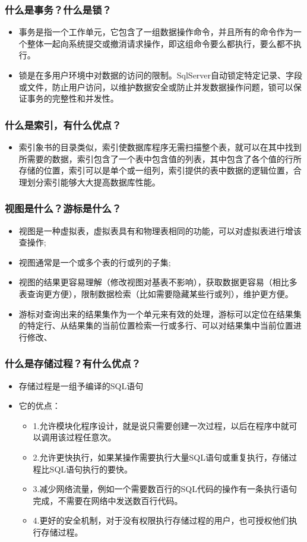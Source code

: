 \documentclass[9pt, b5paper]{article}
\begin{document}
\subsubsection{什么是事务？什么是锁？}
\label{sec-1-2-95}
\begin{itemize}
\item 事务是指一个工作单元，它包含了一组数据操作命令，并且所有的命令作为一个整体一起向系统提交或撤消请求操作，即这组命令要么都执行，要么都不执行。
\item 锁是在多用户环境中对数据的访问的限制。SqlServer自动锁定特定记录、字段或文件，防止用户访问，以维护数据安全或防止并发数据操作问题，锁可以保证事务的完整性和并发性。
\end{itemize}
\subsubsection{什么是索引，有什么优点？}
\label{sec-1-2-96}
\begin{itemize}
\item 索引象书的目录类似，索引使数据库程序无需扫描整个表，就可以在其中找到所需要的数据，索引包含了一个表中包含值的列表，其中包含了各个值的行所存储的位置，索引可以是单个或一组列，索引提供的表中数据的逻辑位置，合理划分索引能够大大提高数据库性能。
\end{itemize}
\subsubsection{视图是什么？游标是什么？}
\label{sec-1-2-97}
\begin{itemize}
\item 视图是一种虚拟表，虚拟表具有和物理表相同的功能，可以对虚拟表进行增该查操作;
\item 视图通常是一个或多个表的行或列的子集;
\item 视图的结果更容易理解（修改视图对基表不影响），获取数据更容易（相比多表查询更方便），限制数据检索（比如需要隐藏某些行或列），维护更方便。
\item 游标对查询出来的结果集作为一个单元来有效的处理，游标可以定位在结果集的特定行、从结果集的当前位置检索一行或多行、可以对结果集中当前位置进行修改、
\end{itemize}
\subsubsection{什么是存储过程？有什么优点？}
\label{sec-1-2-98}
\begin{itemize}
\item 存储过程是一组予编译的SQL语句
\item 它的优点：
\begin{itemize}
\item 1.允许模块化程序设计，就是说只需要创建一次过程，以后在程序中就可以调用该过程任意次。
\item 2.允许更快执行，如果某操作需要执行大量SQL语句或重复执行，存储过程比SQL语句执行的要快。
\item 3.减少网络流量，例如一个需要数百行的SQL代码的操作有一条执行语句完成，不需要在网络中发送数百行代码。
\item 4.更好的安全机制，对于没有权限执行存储过程的用户，也可授权他们执行存储过程。
\end{itemize}
\end{itemize}
\end{document}
